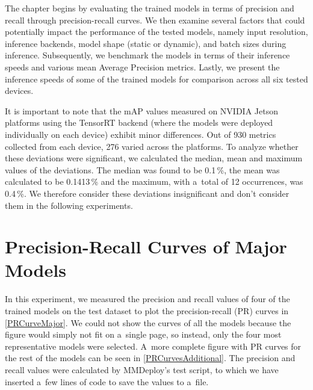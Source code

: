 The chapter begins by evaluating the trained models in terms of precision and
recall through precision-recall curves. We then examine several factors that
could potentially impact the performance of the tested models, namely input
resolution, inference backends, model shape (static or dynamic), and batch sizes
during inference. Subsequently, we benchmark the models in terms of their
inference speeds and various mean Average Precision metrics. Lastly, we present
the inference speeds of some of the trained models for comparison across all six
tested devices.

It is important to note that the mAP values measured on NVIDIA Jetson platforms
using the TensorRT backend (where the models were deployed individually on each
device) exhibit minor differences. Out of 930 metrics collected from each
device, 276 varied across the platforms. To analyze whether these deviations
were significant, we calculated the median, mean and maximum values of the
deviations. The median was found to be 0.1\,\%, the mean was calculated to be
0.1413\,\% and the maximum, with a~total of 12 occurrences, was 0.4\,\%. We
therefore consider these deviations insignificant and don't consider them in the
following experiments.


\section{Precision-Recall Curves of Major Models}


In this experiment, we measured the precision and recall values of four of the
trained models on the test dataset to plot the precision-recall (PR) curves in
\autoref{PRCurveMajor}. We could not show the curves of all the models because
the figure would simply not fit on a~single page, so instead, only the four most
representative models were selected. A~more complete figure with PR curves for
the rest of the models can be seen in \autoref{PRCurvesAdditional}. The
precision and recall values were calculated by MMDeploy's test script, to which
we have inserted a~few lines of code to save the values to a~file.

